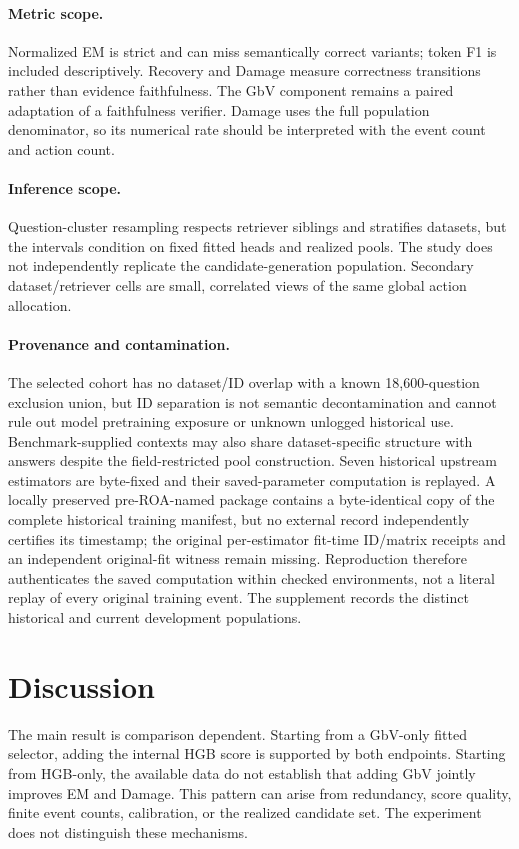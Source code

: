 \documentclass[11pt]{article}
\begin{document}
\paragraph{Metric scope.}
Normalized EM is strict and can miss semantically correct variants; token F1 is included descriptively. Recovery and Damage measure correctness transitions rather than evidence faithfulness. The GbV component remains a paired adaptation of a faithfulness verifier. Damage uses the full population denominator, so its numerical rate should be interpreted with the event count and action count.

\paragraph{Inference scope.}
Question-cluster resampling respects retriever siblings and stratifies datasets, but the intervals condition on fixed fitted heads and realized pools. The study does not independently replicate the candidate-generation population. Secondary dataset/retriever cells are small, correlated views of the same global action allocation.

\paragraph{Provenance and contamination.}
The selected cohort has no dataset/ID overlap with a known 18,600-question exclusion union, but ID separation is not semantic decontamination and cannot rule out model pretraining exposure or unknown unlogged historical use. Benchmark-supplied contexts may also share dataset-specific structure with answers despite the field-restricted pool construction. Seven historical upstream estimators are byte-fixed and their saved-parameter computation is replayed. A locally preserved pre-ROA-named package contains a byte-identical copy of the complete historical training manifest, but no external record independently certifies its timestamp; the original per-estimator fit-time ID/matrix receipts and an independent original-fit witness remain missing. Reproduction therefore authenticates the saved computation within checked environments, not a literal replay of every original training event. The supplement records the distinct historical and current development populations.

\section{Discussion}
The main result is comparison dependent. Starting from a GbV-only fitted selector, adding the internal HGB score is supported by both endpoints. Starting from HGB-only, the available data do not establish that adding GbV jointly improves EM and Damage. This pattern can arise from redundancy, score quality, finite event counts, calibration, or the realized candidate set. The experiment does not distinguish these mechanisms.
\end{document}
